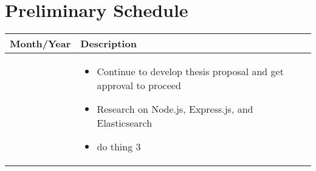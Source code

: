%
\chapter{Preliminary Schedule}
\label{sec:schedule}




\begin{table}[ht]
\centering
\begin{tabularx}{\linewidth}{
    |>{\hsize=0.5\hsize}X|%
    >{\hsize=1.5\hsize}X|%
} \hline
	\textbf{Month/Year} & \textbf{Description} \\ \hline
%
	\rowcolor{mymagenta1}{July 2016} & {\begin{itemize}[noitemsep,leftmargin=*]
			\item Continue to develop thesis proposal and get approval to proceed
			\item Research on Node.js, Express.js, and Elasticsearch
			\item do thing 3
		\end{itemize}} \\ \hline

\end{tabularx}
\end{table}

